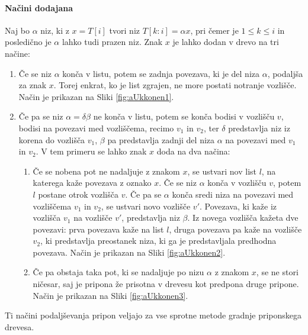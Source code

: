 \paragraph{Načini dodajana}\label{par:naciniDodajanja}
Naj bo $\alpha$ niz, ki z $x=T[i]$ tvori niz $T[k:i]=\alpha x$, pri čemer je $1\le k \le i $ in posledično je $\alpha$ lahko tudi prazen niz. Znak $x$ je lahko dodan v drevo na tri načine:
\begin{enumerate}
    \item \label{enum:dodajanje1} Če se niz $\alpha$ konča v listu, potem se zadnja povezava, ki je del niza $\alpha$, podaljša za znak $x$. Torej enkrat, ko je list zgrajen, ne more postati notranje vozlišče. Način je prikazan na Sliki \ref{fig:aUkkonen1}.
    \item Če pa se niz $\alpha=\delta\beta$ ne konča v listu, potem se konča bodisi v vozlišču $v$, bodisi na povezavi med vozliščema, recimo $v_1$ in $v_2$, ter $\delta$ predstavlja niz iz korena do vozlišča $v_1$, $\beta$ pa predstavlja zadnji del niza $\alpha$ na povezavi med $v_1$ in $v_2$. V tem primeru se lahko znak $x$ doda na dva načina:
    \begin{enumerate}
        \item \label{enum:dodajanje2} Če se nobena pot ne nadaljuje z znakom $x$, se ustvari nov list $l$, na katerega kaže povezava z oznako $x$. Če se niz $\alpha$ konča v vozlišču $v$, potem $l$ postane otrok vozlišča $v$. Če pa se $\alpha$ konča sredi niza na povezavi med vozliščema $v_1$ in $v_2$, se ustvari novo vozlišče $v'$. Povezava, ki kaže iz vozlišča $v_1$ na vozlišče $v'$, predstavlja niz $\beta$. Iz novega vozlišča kažeta dve povezavi: prva povezava kaže na list $l$, druga povezava pa kaže na vozlišče $v_2$, ki predstavlja preostanek niza, ki ga je predstavljala predhodna povezava. Način je prikazan na Sliki \ref{fig:aUkkonen2}.
        \item \label{enum:dodajanje3} Če pa obstaja taka pot, ki se nadaljuje po nizu $\alpha$ z znakom $x$, se ne stori ničesar, saj je pripona že prisotna v drevesu kot predpona druge pripone. Način je prikazan na Sliki \ref{fig:aUkkonen3}.
    \end{enumerate}    
\end{enumerate}
Ti načini podaljševanja pripon veljajo za vse sprotne metode gradnje priponskega drevesa.

